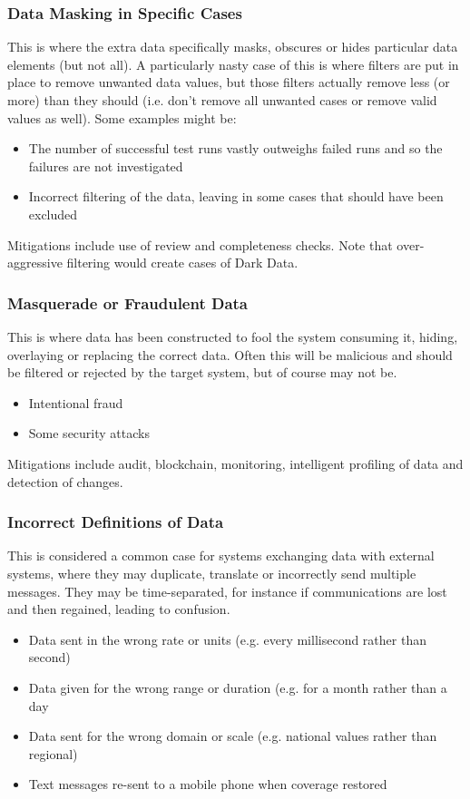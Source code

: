 \subsubsection{Data Masking in Specific Cases}
This is where the extra data specifically masks, obscures or hides particular data elements (but not all). A particularly nasty case of this is where filters are put in place to remove unwanted data values, but those filters actually remove less (or more) than they should (i.e. don’t remove all unwanted cases or remove valid values as well). Some examples might be:
\begin{itemize}
    \item The number of successful test runs vastly outweighs failed runs and so the failures are not investigated
    \item Incorrect filtering of the data, leaving in some cases that should have been excluded
\end{itemize}

Mitigations include use of review and completeness checks. Note that over-aggressive filtering would create cases of Dark Data.
\subsubsection{Masquerade or Fraudulent Data}
This is where data has been constructed to fool the system consuming it, hiding, overlaying or replacing the correct data. Often this will be malicious and should be filtered or rejected by the target system, but of course may not be. 
\begin{itemize}
    \item Intentional fraud
    \item Some security attacks
\end{itemize}

Mitigations include audit, blockchain, monitoring, intelligent profiling of data and detection of changes.

\subsubsection{Incorrect Definitions of Data}
This is considered a common case for systems exchanging data with external systems, where they may duplicate, translate or incorrectly send multiple messages. They may be time-separated, for instance if communications are lost and then regained, leading to confusion.
\begin{itemize}
    \item Data sent in the wrong rate or units (e.g. every millisecond rather than second)
    \item Data given for the wrong range or duration (e.g. for a month rather than a day
    \item Data sent for the wrong domain or scale (e.g. national values rather than regional)
    \item Text messages re-sent to a mobile phone when coverage restored
\end{itemize}

